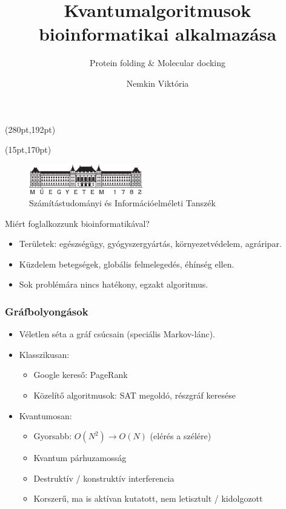 \documentclass[aspectratio=169]{beamer}
\author[Nemkin Viktória]{Nemkin Viktória}
\institute[]{
\begin{small}dr. Friedl Katalin\end{small}
}
\title{Kvantumalgoritmusok bioinformatikai alkalmazása}
\subtitle{Protein folding \& Molecular docking}
\date{}
\begin{document}
\begin{frame}
\titlepage

\begin{textblock*}{150pt}(280pt,192pt) %

\end{textblock*}

\begin{textblock*}{180pt}(15pt,170pt) %
\begin{figure}[H]
\includegraphics[width=140pt]{./figures/bme_logo.pdf}
\caption{Számítástudományi és Információelméleti Tanszék}
\end{figure}

\end{textblock*}

\end{frame}


\begin{frame}{Miért foglalkozzunk bioinformatikával?}
\begin{itemize}
    \item Területek: egészségügy, gyógyszergyártás, környezetvédelem, agráripar.
    \item Küzdelem betegségek, globális felmelegedés, éhínség ellen.
    \item Sok problémára nincs hatékony, egzakt algoritmus.
\end{itemize}
    
\end{frame}



\begin{frame}
  \frametitle{Gráfbolyongások}
  
  \begin{itemize}
    \item Véletlen séta a gráf csúcsain (speciális Markov-lánc).
    \item Klasszikusan:
    \begin{itemize}
        \item Google kereső: PageRank
        \item Közelítő algoritmusok: SAT megoldó, részgráf keresése
    \end{itemize}
    \item Kvantumosan:
    \begin{itemize}
        \item Gyorsabb: $O(N^2) \rightarrow O(N)$ (elérés a szélére)
        \item Kvantum párhuzamosság
        \item Destruktív / konstruktív interferencia
        \item Korszerű, ma is aktívan kutatott, nem letisztult / kidolgozott
    \end{itemize}
  \end{itemize}
\end{frame}
\end{document}
